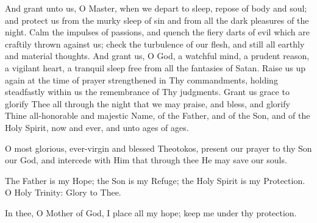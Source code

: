 \documentclass[twoside, letterpaper, 12pt]{report}
\begin{document}
\begin{maybetwocolumns}


And grant unto us, O Master, when we depart to sleep, repose of body and soul;
and protect us from the murky sleep of sin and from all the dark pleasures of the night.
Calm the impulses of passions,
and quench the fiery darts of evil which are craftily thrown against us;
check the turbulence of our flesh, and still all earthly and material thoughts.
And grant us, O God, a watchful mind, a prudent reason, a vigilant heart,
a tranquil sleep free from all the fantasies of Satan.
Raise us up again at the time of prayer strengthened in Thy commandments,
holding steadfastly within us the remembrance of Thy judgments.
Grant us grace to glorify Thee all through the night that we may praise,
and bless, and glorify Thine all-honorable and majestic Name,
of the Father, and of the Son, and of the Holy Spirit,
now and ever, and unto ages of ages.

\end{maybetwocolumns}


O most glorious, ever-virgin and blessed Theotokos, present our prayer to thy Son our God, and
intercede with Him that through thee He may save our souls.


The Father is my Hope; the Son is my Refuge; the Holy Spirit is my Protection. O Holy Trinity:
Glory to Thee.


In thee, O Mother of God, I place all my hope; keep me under thy protection.

\vspace{1cm}



\end{document}
